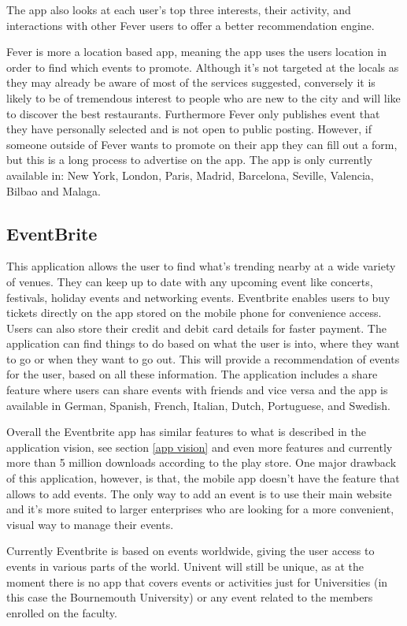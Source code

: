The app also looks at each user’s top three interests, their activity, and interactions with other Fever users to offer a better recommendation engine. 

Fever is more a location based app, meaning the app uses the users location in order to find which events to promote. Although it's not targeted at the locals as they may already be aware of most of the services suggested, conversely it is likely to be of tremendous interest to people who are new to the city and will like to discover the best restaurants. 
Furthermore Fever only publishes event that they have personally selected and is not open to public posting. However, if someone outside of Fever wants to promote on their app they can fill out a form, but this is a long process to advertise on the app.
The app is only currently available in: New York, London, Paris, Madrid, Barcelona, Seville, Valencia, Bilbao and Malaga. 

\subsection{EventBrite}
This application allows the user to find what’s trending nearby at a wide variety of venues. They can keep up to date with any upcoming event like concerts, festivals, holiday events and networking events. Eventbrite enables users to buy tickets directly on the app stored on the mobile phone for convenience access. Users can also store their credit and debit card details for faster payment.
The application can find things to do based on what the user is into, where they want to go or when they want to go out. This will provide a recommendation of events for the user, based on all these information. The application includes a share feature where users can share events with friends and vice versa and the app is available in German, Spanish, French, Italian, Dutch, Portuguese, and Swedish.

Overall the Eventbrite app has similar features to what is described in the application vision, see section \ref{app vision} and even more features and currently more than 5 million downloads according to the play store. One major drawback of this application, however, is that, the mobile app doesn't have the feature that allows to add events. The only way to add an event is to use their main website and it's more suited to larger enterprises who are looking for a more convenient, visual way to manage their events. 

Currently Eventbrite is based on events worldwide, giving the user access to events in various parts of the world. Univent will still be unique, as at the moment there is no app that covers events or activities just for Universities (in this case the Bournemouth University) or any event related to the members enrolled on the faculty.

